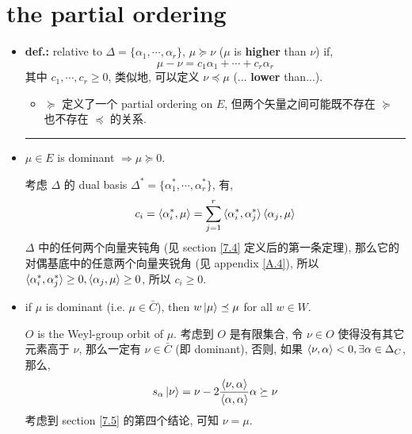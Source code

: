 \section{the partial ordering}
\begin{itemize}
	\item \textbf{def.:} relative to $\Delta = \{\alpha_1, \cdots, \alpha_r\}$, $\mu \succeq \nu$ ($\mu$ is \textbf{higher} than $\nu$) if,
	\begin{equation}
		\mu - \nu = c_1 \alpha_1 + \cdots + c_r \alpha_r
	\end{equation}
	其中 $c_1, \cdots, c_r \geq 0$, 类似地, 可以定义 $\nu \preceq \mu$ (... \textbf{lower} than...).
	\begin{itemize}
		\item $\succeq$ 定义了一个 partial ordering on $E$, 但两个矢量之间可能既不存在 $\succeq$ 也不存在 $\preceq$ 的关系.
	\end{itemize}
	
	\noindent\rule[0.5ex]{\linewidth}{0.5pt} %
	
	\item $\mu \in E$ is dominant $\Longrightarrow \mu \succeq 0$.
	
	\begin{tcolorbox}[title=proof:]
		考虑 $\Delta$ 的 dual basis $\Delta^* = \{\alpha_1^*, \cdots, \alpha_r^*\}$, 有,
		\begin{equation}
			c_i = \braket{\alpha_i^*, \mu} = \sum_{j = 1}^r \braket{\alpha_i^*, \alpha_j^*} \braket{\alpha_j, \mu}
		\end{equation}
		$\Delta$ 中的任何两个向量夹钝角 (见 section \ref{7.4} 定义后的第一条定理), 那么它的对偶基底中的任意两个向量夹锐角 (见 appendix \ref{A.4}), 所以 $\braket{\alpha_i^*, \alpha_j^*} \geq 0, \braket{\alpha_j, \mu} \geq 0$, 所以 $c_i \geq 0$.
	\end{tcolorbox}
	
	\item if $\mu$ is dominant (i.e. $\mu \in \bar{C}$), then $w \ket{\mu} \preceq \mu$ for all $w \in W$.
	
	\begin{tcolorbox}[title=proof:]
		$O$ is the Weyl-group orbit of $\mu$. 考虑到 $O$ 是有限集合, 令 $\nu \in O$ 使得没有其它元素高于 $\nu$, 那么一定有 $\nu \in \bar{C}$ (即 dominant), 否则, 如果 $\braket{\nu, \alpha} < 0, \exists \alpha \in \Delta_C$, 那么,
		\begin{equation}
			s_\alpha \ket{\nu} = \nu - 2 \frac{\braket{\nu, \alpha}}{\braket{\alpha, \alpha}} \alpha \succeq \nu
		\end{equation}
		考虑到 section \ref{7.5} 的第四个结论, 可知 $\nu = \mu$.
		

\end{tcolorbox}
\end{itemize}
